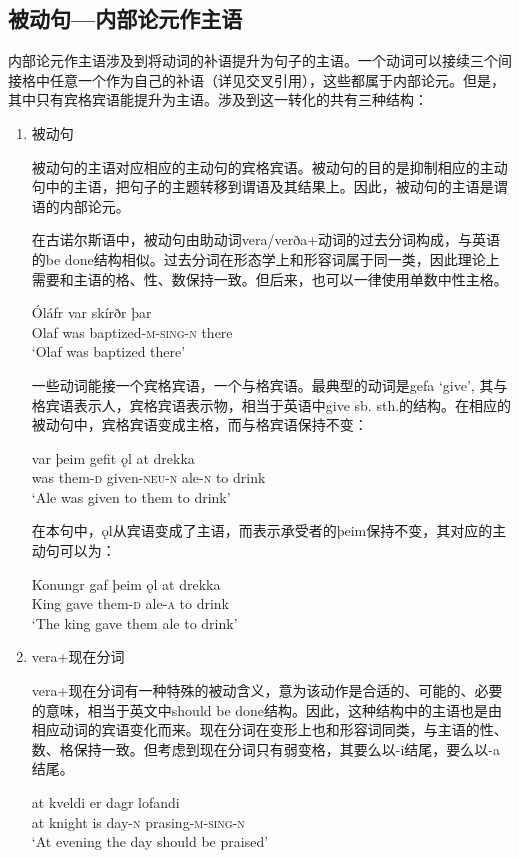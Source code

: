\subsection{被动句—内部论元作主语}
\label{sec:passive}
内部论元作主语涉及到将动词的补语提升为句子的主语。一个动词可以接续三个间接格中任意一个作为自己的补语（详见交叉引用），这些都属于内部论元。但是，其中只有宾格宾语能提升为主语。涉及到这一转化的共有三种结构：
\begin{enumerate}
\setlength{\parindent}{2em}
    \item 被动句

    被动句的主语对应相应的主动句的宾格宾语。被动句的目的是抑制相应的主动句中的主语，把句子的主题转移到谓语及其结果上。因此，被动句的主语是谓语的内部论元。
    
在古诺尔斯语中，被动句由助动词vera/verða+动词的过去分词构成，与英语的be done结构相似。过去分词在形态学上和形容词属于同一类，因此理论上需要和主语的格、性、数保持一致。但后来，也可以一律使用单数中性主格。
\begin{exe}
    \ex
    \gll Óláfr	var	skírðr	þar\\
Olaf	was	baptized-\textsc{\MakeLowercase{M-SING-N }}	there\\
\trans `Olaf was baptized there’
\end{exe}

    一些动词能接一个宾格宾语，一个与格宾语。最典型的动词是gefa `give’, 其与格宾语表示人，宾格宾语表示物，相当于英语中give sb. sth.的结构。在相应的被动句中，宾格宾语变成主格，而与格宾语保持不变：
    \begin{exe}
        \ex
        \gll var	þeim	gefit	ǫl	at	drekka\\
was	them-\textsc{d}	given-\textsc{\MakeLowercase{NEU-N}}	ale-\textsc{n}	to	drink\\
\trans `Ale was given to them to drink’
    \end{exe}

在本句中，ǫl从宾语变成了主语，而表示承受者的þeim保持不变，其对应的主动句可以为：
\begin{exe}
    \ex 
    \gll Konungr	gaf	þeim	ǫl	at	drekka\\
King	gave	them-\textsc{d}	ale-\textsc{a}	to	drink\\
\trans `The king gave them ale to drink’
\end{exe}

\item vera+现在分词

vera+现在分词有一种特殊的被动含义，意为该动作是合适的、可能的、必要的意味，相当于英文中should be done结构。因此，这种结构中的主语也是由相应动词的宾语变化而来。现在分词在变形上也和形容词同类，与主语的性、数、格保持一致。但考虑到现在分词只有弱变格，其要么以-i结尾，要么以-a结尾。
\begin{exe}
    \ex
    \gll at	kveldi	er	dagr	lofandi\\
at	knight	is	day-\textsc{n}	prasing-\textsc{\MakeLowercase{M-SING-N}}\\
\trans `At evening the day should be praised’
\end{exe}


\end{enumerate}
